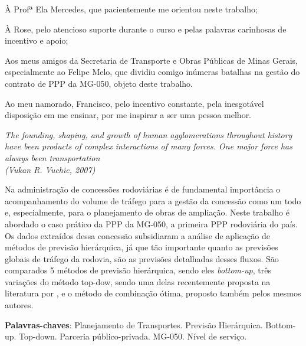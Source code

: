 \documentclass[
	12pt,				%
	openright,			%
	twoside,			%
	a4paper,			%
	english,			%
	french,				%
	spanish,			%
	brazil				%
	]{abntex2}
\begin{document}
\begin{agradecimentos}

À Profª Ela Mercedes, que pacientemente me orientou neste trabalho;

À Rose, pelo atencioso suporte durante o curso e pelas palavras carinhosas de incentivo e apoio;

Aos meus amigos da Secretaria de Transporte e Obras Públicas de Minas Gerais, especialmente ao Felipe Melo, que dividiu comigo inúmeras batalhas na gestão do contrato de PPP da MG-050, objeto deste trabalho.

Ao meu namorado, Francisco, pelo incentivo constante, pela inesgotável disposição em me ensinar, por me inspirar a ser uma pessoa melhor.

\end{agradecimentos}

\begin{epigrafe}
    \vspace*{\fill}
	\begin{flushright}
		\textit{The founding, shaping, and growth of human agglomerations throughout history have been products of complex interactions of many forces. One major force has always been transportation\\
		(Vukan R. Vuchic, 2007)}	
\end{flushright}
\end{epigrafe}


\setlength{\absparsep}{18pt} %
\begin{resumo}

Na administração de concessões rodoviárias é de fundamental importância o acompanhamento do volume de tráfego para a gestão da concessão como um todo e, especialmente, para o planejamento de obras de ampliação. Neste trabalho é abordado o caso prático da PPP da MG-050, a primeira PPP rodoviária do país. Os dados extraídos dessa concessão subsidiaram a análise de aplicação de métodos de previsão hierárquica, já que tão importante quanto as previsões globais de tráfego da rodovia, são as previsões detalhadas desses fluxos.
São comparados 5 métodos de previsão hierárquica, sendo eles \emph{bottom-up}, três variações do método top-dow, sendo uma delas recentemente proposta na literatura por , e o método de combinação ótima, proposto também pelos mesmos autores.


 \textbf{Palavras-chaves}: Planejamento de Transportes. Previsão Hierárquica. Bottom-up. Top-down. Parceria público-privada. MG-050. Nível de serviço.
\end{resumo}
\end{document}
